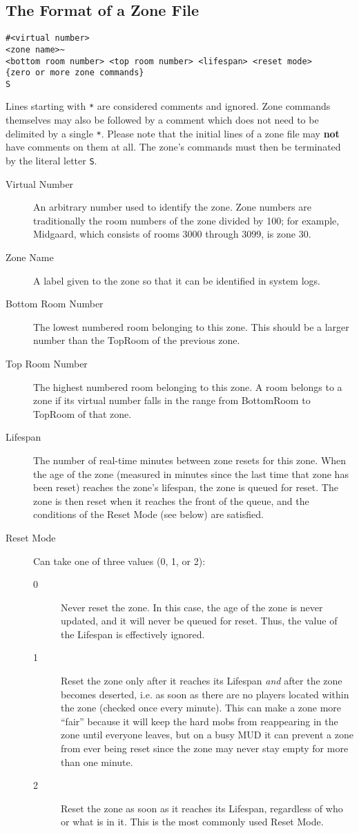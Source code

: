 \documentclass[11pt]{article}
\begin{document}
\subsection{The Format of a Zone File}
\begin{verbatim}
#<virtual number>
<zone name>~
<bottom room number> <top room number> <lifespan> <reset mode>
{zero or more zone commands}
S
\end{verbatim}
Lines starting with \texttt{*} are considered comments and ignored.  Zone commands themselves may also be followed by a comment which does not need to be delimited by a single \texttt{*}. Please note that the initial lines of a zone file may {\bf not} have comments on them at all.  The zone's commands must then be terminated by the literal letter \texttt{S}.
\begin{description}
\item[Virtual Number] An arbitrary number used to identify the zone.  Zone numbers are traditionally the room numbers of the zone divided by 100; for example, Midgaard, which consists of rooms 3000 through 3099, is zone 30.
\item[Zone Name] A label given to the zone so that it can be identified in system logs.
\item[Bottom Room Number] The lowest numbered room belonging to this zone.  This should be a larger number than the TopRoom of the previous zone.
\item[Top Room Number] The highest numbered room belonging to this zone.  A room belongs to a zone if its virtual number falls in the range from BottomRoom to TopRoom of that zone.
\item[Lifespan] The number of real-time minutes between zone resets for this zone.  When the age of the zone (measured in minutes since the last time that zone has been reset) reaches the zone's lifespan, the zone is queued for reset.  The zone is then reset when it reaches the front of the queue, and the conditions of the Reset Mode (see below) are satisfied.
\item[Reset Mode] Can take one of three values (0, 1, or 2):
\begin{description}
\item[0] Never reset the zone.  In this case, the age of the zone is never updated, and it will never be queued for reset.  Thus, the value of the Lifespan is effectively ignored.
\item[1] Reset the zone only after it reaches its Lifespan {\em and} after the zone becomes deserted, i.e. as soon as there are no players located within the zone (checked once every minute).  This can make a zone more ``fair'' because it will keep the hard mobs from reappearing in the zone until everyone leaves, but on a busy MUD it can prevent a zone from ever being reset since the zone may never stay empty for more than one minute.
\item[2] Reset the zone as soon as it reaches its Lifespan, regardless of who or what is in it.  This is the most commonly used Reset Mode.
\end{description}
\end{description}
\end{document}
